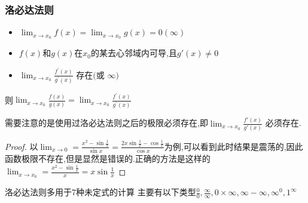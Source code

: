 \documentclass[12pt, a4paper, oneside, UTF8]{ctexbook}  %
\begin{document}
\begin{sloppypar}
    \subsubsection{洛必达法则}
    \begin{defn}{}{}
        \begin{itemize}
            \item $\lim_{x\to x_0}f(x)=\lim_{x\to x_0}g(x)=0(\infty)$
            \item $f(x)$和$g(x)$在$x_0$的某去心邻域内可导,且$g'(x) \neq 0$
            \item $\lim_{x\to x_0}\frac{f^{\prime}(x)}{g^{\prime}(x)}\text{ 存在(或 }\infty)$
        \end{itemize}
        则$\lim_{x\to x_{0}}\frac{f(x)}{g(x)}=\lim_{x\to x_{0}}\frac{f^{'}(x)}{g^{'}(x)}$
    \end{defn}
    需要注意的是使用过洛必达法则之后的极限必须存在,即$\lim _{x \to x_0}\frac{f'(x)}{g'(x)}$ 必须存在.
    \begin{proof}
        以$\lim _{x \to 0}=\frac{x^2-\sin \frac{1}{x}}{\sin x}=\frac{2x\sin \frac{1}{x}-\cos\frac{1}{x}}{\cos x}$为例,可以看到此时结果是震荡的,因此函数极限不存在,但是显然是错误的.正确的方法是这样的$\lim _{x \to x_0}=\frac{x^2-\sin \frac{1}{x}}{x}=x\sin \frac{1}{x}$
    \end{proof}
    洛必达法则多用于7种未定式的计算
    主要有以下类型$\frac{0}{0},\frac{\infty}{\infty},0 \times \infty,\infty -\infty,\infty ^0,1^\infty$


\end{sloppypar}
\end{document}
